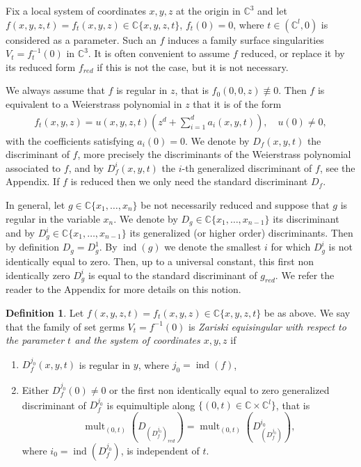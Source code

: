 \documentclass[11pt,a4paper]{amsart}
\newcommand{\1}{{1\!\!1}}
\numberwithin{equation}{section}
\theoremstyle{plain}%
\theoremstyle{definition}
\newtheorem{defi}[thm]{Definition}
\theoremstyle{definition}
\theoremstyle{remark}
\newcommand{\C}{\mathbb{C}}
\renewcommand{\1}{\mathbf{1}}
\newcommand{\inv}{^{-1}}
\DeclareMathOperator{\idiscr}{ind}
\DeclareMathOperator{\mult}{mult}
\begin{document}
Fix a local system of coordinates $x,y,z$ at the origin in $\C^3$ and let  
$f(x,y,z, t)= f_t(x,y,z) \in \C\{x,y,z,t\}$, $f_t(0)=0$,  
 where $t\in (\C^l,0)$ is considered as a parameter. Such an $f$ induces a family surface singularities $V_t=f_t\inv  (0)$ in $\C^3$.  It is often convenient to assume $f$ reduced, or replace it by its reduced form $f_{red}$ if this is not the case, but it is not necessary. 

We always assume that $f$ is regular in $z$, that is $f_0(0,0,z) \not \equiv 0$.  
Then $f$ is equivalent to a Weierstrass polynomial in $z$ that  it is of the form  
  \begin{align}\label{eq:family}
f_t(x,y,z)= u (x,y,z, t) (z^{d}+ \sum_{i=1}^{d} a_{i} (x,y,t)), \quad u(0)\ne 0 ,   
\end{align} 
with the coefficients satisfying $a_{i}(0)= 0$.  We denote by $D_f (x,y, t)$ the discriminant of $f$, 
more precisely the discriminants of the Weierstrass polynomial associated to $f$, and by $D^i_f (x,y, t) $ the $i$-th generalized discriminant of $f$, see the Appendix.  If $f$ is reduced then we only need the standard discriminant $D_f$.  

In general, let $g\in \C \{x_1, \ldots , x_n\}$ be not necessarily reduced and suppose that 
  $g$ is regular in the variable $x_n$.  We denote by $D_g\in \C \{x_1, \ldots , x_{n-1}\} $ its discriminant and by $D^i_g \in \C \{x_1, \ldots , x_{n-1}\} $ its generalized (or higher order) discriminants.  Then by definition $D_g=D^1_g$.  By  $\idiscr (g) $ we denote the smallest $i$ for which $D^i_g$ is not identically equal to zero.  Then,  up to a universal constant, this first non identically zero $D^i_g$ is equal to the standard discriminant of $g_{red}$.  We refer the reader to the Appendix  for more details on this notion.  
 
\begin{defi}\label{def:newZAinfamilies}
Let $f(x,y,z, t)= f_t(x,y,z) \in \C\{x,y,z,t\}$ be as above.  We say that the family of set germs $V_t = f\inv (0)$ is \emph{Zariski equisingular with respect to the parameter $t$ and the system of coordinates $x,y,z$} if 
\begin{enumerate}
\item 
$D^{j_0}_f (x,y, t) $ is regular in $y$, where $j_0 = \idiscr (f) $,
\item
Either $D^{j_0}_f (0) \ne  0 $ or 
the first non identically equal to zero generalized discriminant of $D^{j_0}_f $ 
is equimultiple along $\{(0,t)\in \C\times \C^l\}$, that is 
$$\mult_{(0,t)} (D_{(D^{j_0}_f)_{red}}) = \mult_{(0,t)} (D^{i_0}_{(D^{j_0}_f)}) ,$$ where $i_0 = \idiscr (D^{j_0}_f) $,  is independent of $t$.  
\end{enumerate}
\end{defi}
\end{document}
